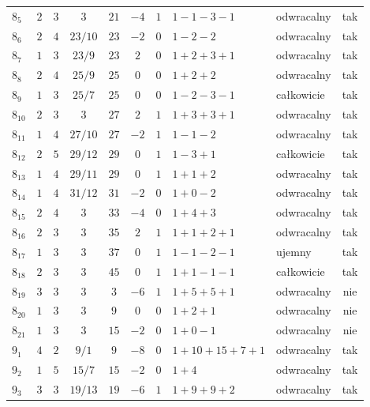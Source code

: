 \begin{longtable}{lccccccllc}
$8_{5}$    & $2$   & $3$ & $3$ & $21$  & $-4$ & $1$ & $1-1-3-1$     & odwracalny & tak \\
$8_{6}$    & $2$   & $4$ & $23/10$ & $23$  & $-2$ & $0$ & $1-2-2$       & odwracalny & tak \\
$8_{7}$    & $1$   & $3$ & $23/9$ & $23$  & $2$  & $0$ & $1+2+3+1$     & odwracalny & tak \\
$8_{8}$    & $2$   & $4$ & $25/9$ & $25$  & $0$  & $0$ & $1+2+2$       & odwracalny & tak \\
$8_{9}$    & $1$   & $3$ & $25/7$ & $25$  & $0$  & $0$ & $1-2-3-1$     & całkowicie & tak \\
$8_{10}$   & $2$   & $3$ & $3$ & $27$  & $2$  & $1$ & $1+3+3+1$     & odwracalny & tak \\
$8_{11}$   & $1$   & $4$ & $27/10$ & $27$  & $-2$ & $1$ & $1-1-2$       & odwracalny & tak \\
$8_{12}$   & $2$   & $5$ & $29/12$ & $29$  & $0$  & $1$ & $1-3+1$       & całkowicie & tak \\
$8_{13}$   & $1$   & $4$ & $29/11$ & $29$  & $0$  & $1$ & $1+1+2$       & odwracalny & tak \\
$8_{14}$   & $1$   & $4$ & $31/12$ & $31$  & $-2$ & $0$ & $1+0-2$       & odwracalny & tak \\
$8_{15}$   & $2$   & $4$ & $3$ & $33$  & $-4$ & $0$ & $1+4+3$       & odwracalny & tak \\
$8_{16}$   & $2$   & $3$ & $3$ & $35$  & $2$  & $1$ & $1+1+2+1$     & odwracalny & tak \\
$8_{17}$   & $1$   & $3$ & $3$ & $37$  & $0$  & $1$ & $1-1-2-1$     & ujemny     & tak \\
$8_{18}$   & $2$   & $3$ & $3$ & $45$  & $0$  & $1$ & $1+1-1-1$     & całkowicie & tak \\
$8_{19}$   & $3$   & $3$ & $3$ & $3$   & $-6$ & $1$ & $1+5+5+1$     & odwracalny & nie \\
$8_{20}$   & $1$   & $3$ & $3$ & $9$   & $0$  & $0$ & $1+2+1$       & odwracalny & nie \\
$8_{21}$   & $1$   & $3$ & $3$ & $15$  & $-2$ & $0$ & $1+0-1$       & odwracalny & nie \\
$9_{1}$    & $4$   & $2$ & $9/1$ & $9$   & $-8$ & $0$ & $1+10+15+7+1$ & odwracalny & tak \\
$9_{2}$    & $1$   & $5$ & $15/7$ & $15$  & $-2$ & $0$ & $1+4$         & odwracalny & tak \\
$9_{3}$    & $3$   & $3$ & $19/13$ & $19$  & $-6$ & $1$ & $1+9+9+2$     & odwracalny & tak \\

\end{longtable}

